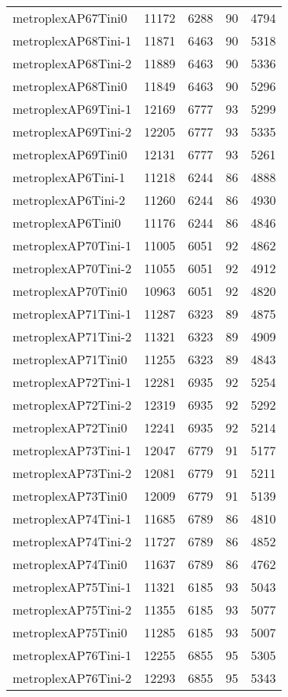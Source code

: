 \begin{longtable}{lrrrr}
metroplexAP67Tini0 & 11172 & 6288 & 90 & 4794 \\
metroplexAP68Tini-1 & 11871 & 6463 & 90 & 5318 \\
metroplexAP68Tini-2 & 11889 & 6463 & 90 & 5336 \\
metroplexAP68Tini0 & 11849 & 6463 & 90 & 5296 \\
metroplexAP69Tini-1 & 12169 & 6777 & 93 & 5299 \\
metroplexAP69Tini-2 & 12205 & 6777 & 93 & 5335 \\
metroplexAP69Tini0 & 12131 & 6777 & 93 & 5261 \\
metroplexAP6Tini-1 & 11218 & 6244 & 86 & 4888 \\
metroplexAP6Tini-2 & 11260 & 6244 & 86 & 4930 \\
metroplexAP6Tini0 & 11176 & 6244 & 86 & 4846 \\
metroplexAP70Tini-1 & 11005 & 6051 & 92 & 4862 \\
metroplexAP70Tini-2 & 11055 & 6051 & 92 & 4912 \\
metroplexAP70Tini0 & 10963 & 6051 & 92 & 4820 \\
metroplexAP71Tini-1 & 11287 & 6323 & 89 & 4875 \\
metroplexAP71Tini-2 & 11321 & 6323 & 89 & 4909 \\
metroplexAP71Tini0 & 11255 & 6323 & 89 & 4843 \\
metroplexAP72Tini-1 & 12281 & 6935 & 92 & 5254 \\
metroplexAP72Tini-2 & 12319 & 6935 & 92 & 5292 \\
metroplexAP72Tini0 & 12241 & 6935 & 92 & 5214 \\
metroplexAP73Tini-1 & 12047 & 6779 & 91 & 5177 \\
metroplexAP73Tini-2 & 12081 & 6779 & 91 & 5211 \\
metroplexAP73Tini0 & 12009 & 6779 & 91 & 5139 \\
metroplexAP74Tini-1 & 11685 & 6789 & 86 & 4810 \\
metroplexAP74Tini-2 & 11727 & 6789 & 86 & 4852 \\
metroplexAP74Tini0 & 11637 & 6789 & 86 & 4762 \\
metroplexAP75Tini-1 & 11321 & 6185 & 93 & 5043 \\
metroplexAP75Tini-2 & 11355 & 6185 & 93 & 5077 \\
metroplexAP75Tini0 & 11285 & 6185 & 93 & 5007 \\
metroplexAP76Tini-1 & 12255 & 6855 & 95 & 5305 \\
metroplexAP76Tini-2 & 12293 & 6855 & 95 & 5343 \\

\end{longtable}
